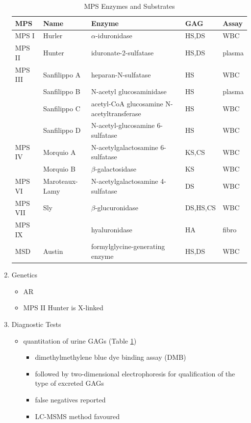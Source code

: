 \documentclass{scrartcl}
\begin{document}
\begin{enumerate}
\begin{table}[htbp]
\caption[Mucopolysaccharidoses]{\label{tab:orgaed9e4b}
MPS Enzymes and Substrates}
\centering
\begin{tabular}{lllll}
MPS & Name & Enzyme & GAG & Assay\\
\hline
MPS I & Hurler & \(\alpha\)-iduronidase & HS,DS & WBC\\
\hline
MPS II & Hunter & iduronate-2-sulfatase & HS,DS & plasma\\
\hline
MPS III & Sanfilippo A & heparan-N-sulfatase & HS & WBC\\
 & Sanfilippo B & N-acetyl glucosaminidase & HS & plasma\\
 & Sanfilippo C & acetyl-CoA glucosamine N-acetyltransferase & HS & WBC\\
 & Sanfilippo D & N-acetyl-glucosamine 6-sulfatase & HS & WBC\\
\hline
MPS IV & Morquio A & N-acetylgalactosamine 6-sulfatase & KS,CS & WBC\\
 & Morquio B & \(\beta\)-galactosidase & KS & WBC\\
\hline
MPS VI & Maroteaux-Lamy & N-acetylgalactosamine 4-sulfatase & DS & WBC\\
MPS VII & Sly & \(\beta\)-glucuronidase & DS,HS,CS & WBC\\
MPS IX &  & hyaluronidase & HA & fibro\\
MSD & Austin & formylglycine-generating enzyme & HS,DS & WBC\\
\end{tabular}
\end{table}


\item Genetics
\label{sec:org4e6e284}
\begin{itemize}
\item AR
\item MPS II Hunter is X-linked
\end{itemize}

\item Diagnostic Tests
\label{sec:org1a73115}
\begin{itemize}
\item quantitation of urine GAGs (Table \ref{tab:orgaed9e4b})
\begin{itemize}
\item dimethylmethylene blue dye binding assay (DMB)
\item followed by two-dimensional electrophoresis for qualification of
the type of excreted GAGs
\item false negatives reported
\item LC-MSMS method favoured
\end{itemize}


\end{itemize}
\end{enumerate}
\end{document}
